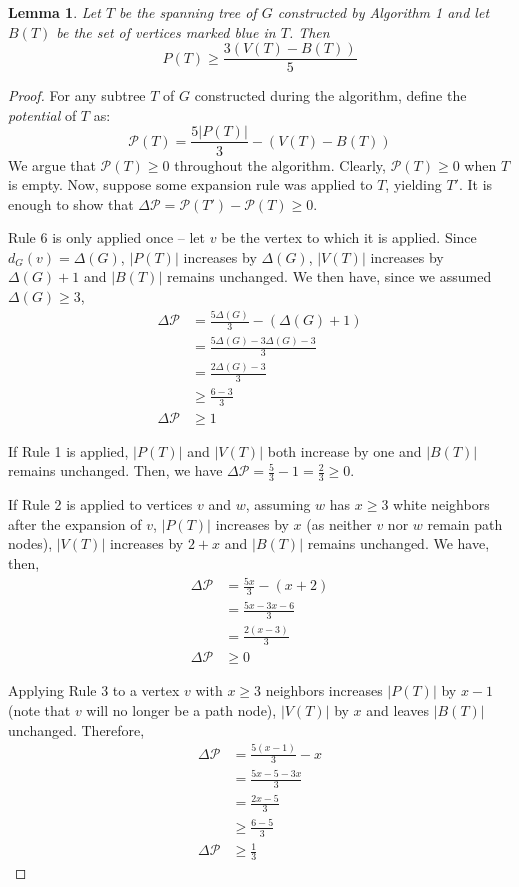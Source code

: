 \documentclass[12pt]{article}
\newtheorem{lemma}[theorem]{Lemma}
\begin{document}
\begin{lemma}
  Let $T$ be the spanning tree of $G$ constructed by Algorithm 1 and let $B(T)$ be the set of vertices marked blue in $T$.
  Then
  $$ P(T) \ge \frac{3(V(T) - B(T))}{5} $$
\end{lemma}
\begin{proof}
  For any subtree $T$ of $G$ constructed during the algorithm, define the \emph{potential} of $T$ as:
  $$ \mathcal{P}(T) = \frac{5|P(T)|}{3} - (V(T) - B(T)) $$
  We argue that $\mathcal{P}(T) \ge 0$ throughout the algorithm.
  Clearly, $\mathcal{P}(T) \ge 0$ when $T$ is empty.
  Now, suppose some expansion rule was applied to $T$, yielding $T'$.
  It is enough to show that $\Delta \mathcal{P} = \mathcal{P}(T') - \mathcal{P}(T) \ge 0$.

  Rule 6 is only applied once -- let $v$ be the vertex to which it is applied.
  Since $d_G(v) = \Delta(G)$, $|P(T)|$ increases by $\Delta(G)$, $|V(T)|$ increases by $\Delta(G) + 1$ and $|B(T)|$ remains unchanged.
  We then have, since we assumed $\Delta(G) \ge 3$,
  \begin{align*}
    \Delta \mathcal{P} &= \frac{5\Delta(G)}{3} - (\Delta(G) + 1) \\
                       &= \frac{5\Delta(G) - 3\Delta(G) - 3}{3} \\
                       &= \frac{2\Delta(G) - 3}{3} \\
                       &\ge \frac{6 - 3}{3} \\
    \Delta \mathcal{P} &\ge 1
  \end{align*}

  If Rule 1 is applied, $|P(T)|$ and $|V(T)|$ both increase by one and $|B(T)|$ remains unchanged.
  Then, we have $\Delta \mathcal{P} = \frac{5}{3} - 1 = \frac{2}{3} \ge 0$.

  If Rule 2 is applied to vertices $v$ and $w$, assuming $w$ has $x \ge 3$ white neighbors after the expansion of $v$, $|P(T)|$ increases by $x$ (as neither $v$ nor $w$ remain path nodes), $|V(T)|$ increases by $2 + x$ and $|B(T)|$ remains unchanged.
  We have, then,
  \begin{align*}
    \Delta \mathcal{P} &= \frac{5x}{3} - (x + 2) \\
                       &= \frac{5x - 3x - 6}{3}\\
                       &= \frac{2(x - 3)}{3} \\
    \Delta \mathcal{P} &\ge 0
  \end{align*}

  Applying Rule 3 to a vertex $v$ with $x \ge 3$ neighbors increases $|P(T)|$ by $x - 1$ (note that $v$ will no longer be a path node), $|V(T)|$ by $x$ and leaves $|B(T)|$ unchanged.
  Therefore,
  \begin{align*}
    \Delta \mathcal{P} &= \frac{5(x - 1)}{3} - x \\
                       &= \frac{5x - 5 - 3x}{3} \\
                       &= \frac{2x - 5}{3} \\
                       &\ge \frac{6 - 5}{3} \\
    \Delta \mathcal{P} &\ge \frac{1}{3}
  \end{align*}


\end{proof}
\end{document}
